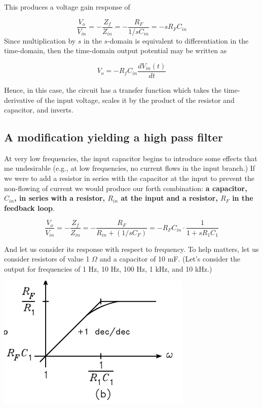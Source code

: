 \documentclass[11pt]{book}
\begin{document}
This produces a voltage gain response of

\begin{equation}
	\frac{V_o}{V_{in}} = -\frac{Z_f}{Z_{in}} = -\frac{R_F}{1/sC_{in}} = -sR_FC_{in}
\end{equation}
Since multiplication by $s$ in the $s$-domain is equivalent to differentiation in the time-domain, then the time-domain output potential may be written as

\begin{equation}
	V_o = -R_fC_{in}\frac{d V_{in}(t)}{dt}
\end{equation}

Hence, in this case, the circuit has a transfer function which takes the time-derivative of the input voltage, scales it by the product of the resistor and capacitor, and inverts.

\subsection{A modification yielding a high pass filter}
At very low frequencies, the input capacitor begins to introduce some effects that me undesirable (e.g., at low frequencies, no current flows in the input branch.) If we were to add a resistor in series with the capacitor at the input to prevent the non-flowing of current we would produce our forth combination: \textbf{a capacitor, $C_{in}$, in series with a resistor, $R_{in}$ at the input and a resistor, $R_F$ in the feedback loop}.

\begin{equation}
	\frac{V_o}{V_{in}} = -\frac{Z_f}{Z_{in}} = -\frac{R_F}{R_{in} + (1/sC_F)} = -R_FC_{in}\cdot\frac{1}{1 + sR_1C_1}
\end{equation}

And let us consider its response with respect to frequency. To help matters, let us consider resistors of value 1 $\Omega$ and a capacitor of 10 mF. (Let's consider the output for frequencies of 1 Hz, 10 Hz, 100 Hz, 1 kHz, and 10 kHz.)

\begin{center}\includegraphics{figures/15.03.png}\end{center}
\end{document}
